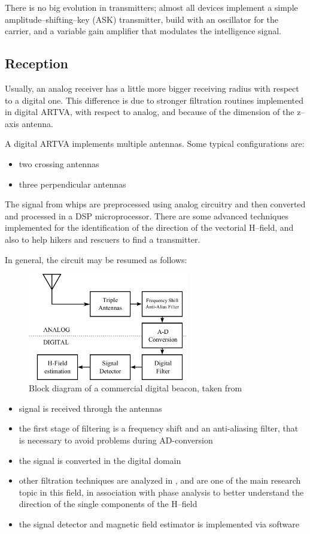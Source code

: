 There is no big evolution in transmitters; almost all devices implement a simple amplitude--shifting--key (ASK) transmitter, build with an oscillator for the carrier, and a variable gain amplifier that modulates the intelligence signal.

\subsection{Reception}

Usually, an analog receiver has a little more bigger receiving radius with respect to a digital one. This difference is due to stronger filtration routines implemented in digital ARTVA, with respect to analog, and because of the dimension of the z--axis antenna.

A digital ARTVA implements multiple antennas. Some typical configurations are:
\begin{itemize}
\item two crossing antennas
\item three perpendicular antennas
\end{itemize}
The signal from whips are preprocessed using analog circuitry and then converted and processed in a DSP microprocessor. There are some advanced techniques\citep{Salos2007} implemented for the identification of the direction of the vectorial H--field, and also to help hikers and rescuers to find a transmitter. 

In general, the circuit may be resumed as follows:

\begin{figure}
	\centering
	\includegraphics[width=7cm]{ch1/img/img_schema_arva.pdf}
	\caption{Block diagram of a commercial digital beacon, taken from \citep{Salos2007}}
\end{figure}


\begin{itemize}
\item signal is received through the antennas
\item the first stage of filtering is a frequency shift and  an anti-aliasing filter, that is necessary to avoid problems during AD-conversion
\item the signal is converted in the digital domain
\item other filtration techniques are analyzed  in \citep{Salos2007}, and are one of the main research topic in this field, in association with phase analysis to better understand the direction of the single components of the H--field
\item the signal detector and magnetic field estimator is implemented via software
\end{itemize}

